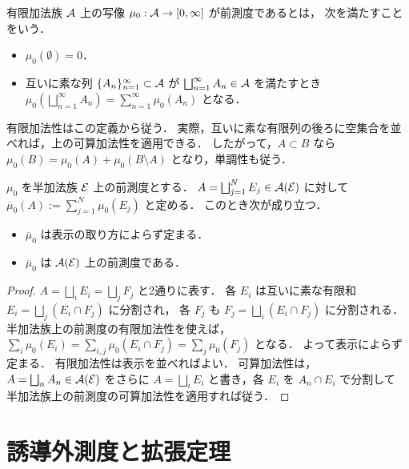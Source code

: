 \begin{definition}[有限加法族上の前測度]\label{def:premeasure-on-algebra}
有限加法族 $\mathcal A$ 上の写像 $\mu_0:\mathcal A\to[0,\infty]$ が前測度であるとは，
次を満たすことをいう．
\begin{itemize}
    \item $\mu_0(\emptyset)=0$．
    \item 互いに素な列 $\{A_n\}_{n=1}^{\infty}\subset\mathcal A$ が
    $\bigsqcup_{n=1}^{\infty} A_n\in\mathcal A$ を満たすとき
    $\mu_0(\bigsqcup_{n=1}^{\infty} A_n)=\sum_{n=1}^{\infty}\mu_0(A_n)$ となる．
\end{itemize}
\end{definition}

\begin{remark}
有限加法性はこの定義から従う．
実際，互いに素な有限列の後ろに空集合を並べれば，上の可算加法性を適用できる．
したがって，$A\subset B$ なら
$\mu_0(B)=\mu_0(A)+\mu_0(B\setminus A)$ となり，単調性も従う．
\end{remark}

\begin{theorem}[有限加法族への延長]\label{thm:premeasure-extension-to-algebra}
$\mu_0$ を半加法族 $\mathcal E$ 上の前測度とする．
$A=\bigsqcup_{j=1}^{N}E_j\in\mathcal A(\mathcal E)$ に対して
$\overline\mu_0(A):=\sum_{j=1}^{N}\mu_0(E_j)$ と定める．
このとき次が成り立つ．
\begin{itemize}
    \item $\overline\mu_0$ は表示の取り方によらず定まる．
    \item $\overline\mu_0$ は $\mathcal A(\mathcal E)$ 上の前測度である．
\end{itemize}
\end{theorem}
\begin{proof}
$A=\bigsqcup_i E_i=\bigsqcup_j F_j$ と2通りに表す．
各 $E_i$ は互いに素な有限和 $E_i=\bigsqcup_j(E_i\cap F_j)$ に分割され，
各 $F_j$ も $F_j=\bigsqcup_i(E_i\cap F_j)$ に分割される．
半加法族上の前測度の有限加法性を使えば，
$\sum_i\mu_0(E_i)=\sum_{i,j}\mu_0(E_i\cap F_j)=\sum_j\mu_0(F_j)$ となる．
よって表示によらず定まる．
有限加法性は表示を並べればよい．
可算加法性は，$A=\bigsqcup_n A_n\in\mathcal A(\mathcal E)$ をさらに
$A=\bigsqcup_i E_i$ と書き，各 $E_i$ を $A_n\cap E_i$ で分割して
半加法族上の前測度の可算加法性を適用すれば従う．
\end{proof}

\section{誘導外測度と拡張定理}

